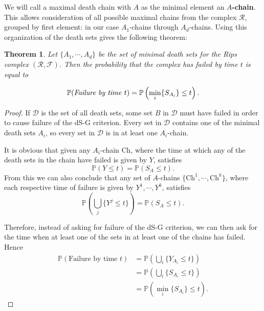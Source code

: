 \documentclass[10pt,twocolumn]{article} \usepackage{amsmath,epsf,amssymb,cite,pifont,amsthm, mathrsfs,epsfig,  bbm, amsthm,  setspace}
\newtheorem{thm}{Theorem}
\newcommand{\DD}{\mathcal D}
\renewcommand{\P}{\mathbb P}
\newcommand{\RR}{\mathcal R}
\renewcommand{\1}{\mathbbm{1}}
\newcommand{\RF}{\mathcal{R},\mathcal{F}}
\newcommand{\Ch}{\textrm{Ch}}
\newcommand{\mindeath}{d}
\begin{document}
We will call a maximal death chain with $A$ as the minimal element an \textbf{$A$-chain}.
This allows consideration of all possible maximal chains from the complex $\RR$,
grouped by first element: in our case $A_1$-chains through $A_\mindeath$-chains.
Using this organization of the death sets gives the following theorem:


\begin{thm}
Let $\{A_1,\cdots,A_\mindeath\}$ be the set of minimal death sets for the Rips complex $(\RF)$.
Then the probability that the complex has failed by time $t$ is equal to

	\begin{equation*}
		\P(\textrm{\emph{Failure by time }}t)= \P\left(\min_i\{S_{A_i} \} \leq t\right).
	\end{equation*}
	
\end{thm}

\begin{proof}
If $\DD$ is the set of all death sets, some set $B$ in $\DD$ must have failed in order to cause failure of the dS-G criterion.
Every set in $\DD$ contains one of the minimal death sets $A_i$,
so every set in $\DD$ is in at least one $A_i$-chain.

It is obvious that given any $A_i$-chain $\Ch$, where the time at which any of the death sets in the chain have failed is given by $Y$, satisfies
\begin{equation*}
 \P\left( Y \leq t \right) = \P(S_A\leq t).
\end{equation*}
From this we can also conclude that any set of $A$-chains $\{\Ch^1,\cdots,\Ch^k\}$, where each respective time of failure is given by $Y^1,\cdots,Y^k$, satisfies
\begin{equation*}
 \P\left( \bigcup_j \{Y^j \leq t \}\right) = \P(S_A\leq t).
\end{equation*}

Therefore, instead of asking for failure of the dS-G criterion, we can then ask for the time when at least one of the
sets in at least one of the chains has failed.
Hence
	\begin{align*}
		\P(\textrm{Failure by time }t)
			&=\P\left(\bigcup_i\{Y_{A_i}\leq t\}\right)\\
			&=\P\left(\bigcup_i\{S_{A_i}\leq t\}\right)\\
			&=\P\left(\min_i\{S_{A_i}\}\leq t\right).
	\end{align*}

\end{proof}
\end{document}
